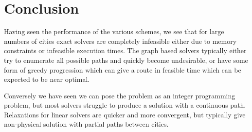 \documentclass[a4paper, 11pt]{article}
\begin{document}
\section{Conclusion}
\label{sec:conclusion}

Having seen the performance of the various schemes, we see that for large numbers of cities exact solvers are completely infeasible either due to memory constraints or infeasible execution times. The graph based solvers typically either try to enumerate all possible paths and quickly become undesirable, or have some form of greedy progression which can give a route in feasible time which can be expected to be near optimal.

Conversely we have seen we can pose the problem as an integer programming problem, but most solvers struggle to produce a solution with a continuous path. Relaxations for linear solvers are quicker and more convergent, but typically give non-physical solution with partial paths between cities. 

\clearpage

\end{document}
